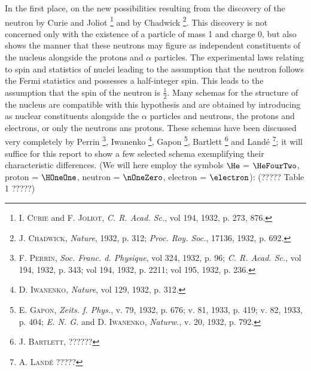 \documentclass{article}
\begin{document}
In the first place, on the new possibilities resulting from the discovery of the neutron by Curie and Joliot \footnote{\textsc{I. Curie} and \textsc{F. Joliot}, \textit{C. R. Acad. Sc.}, vol 194, 1932, p. 273, 876.} and by Chadwick \footnote{\textsc{J. Chadwick}, \textit{Nature}, 1932, p. 312; \textit{Proc. Roy. Soc.}, 17136, 1932, p. 692.}. This discovery is not concerned only with the existence of a particle of mass 1 and charge 0, but also shows the manner that these neutrons may figure as independent constituents of the nucleus alongside the protons and $\alpha$ particles. The experimental laws relating to spin and statistics of nuclei leading to the assumption that the neutron follows the Fermi statistics and possesses a half-integer spin. This leads to the assumption that the spin of the neutron is $\frac{1}{2}$.
Many schemas for the structure of the nucleus are compatible with this hypothesis and are obtained by introducing as nuclear constituents alongside the $\alpha$ particles and neutrons, the protons and electrons, or only the neutrons ans protons. These schemas have been discussed very completely by Perrin \footnote{\textsc{F. Perrin}, \textit{Soc. Franc. d. Physique}, vol 324, 1932, p. 96; \textit{C. R. Acad. Sc.}, vol 194, 1932, p. 343; vol 194, 1932, p. 2211; vol 195, 1932, p. 236.}, Iwanenko \footnote{\textsc{D. Iwanenko}, \textit{Nature}, vol 129, 1932, p. 312.}, Gapon \footnote{\textsc{E. Gapon}, \textit{Zeits. f. Phys.}, v. 79, 1932, p. 676; v. 81, 1933, p. 419; v. 82, 1933, p. 404; \textit{E. N. G.} and \textsc{D. Iwanenko}, \textit{Naturw.}, v. 20, 1932, p. 792.}, Bartlett \footnote{\textsc{J. Bartlett}, ??????} and Landé \footnote{\textsc{A. Landé} ?????}; it will suffice for this report to show a few selected schema exemplifying their characteristic differences. (We will here employ the symbols $\He$ = $\HeFourTwo$, proton = $\HOneOne$, neutron = $\nOneZero$, electron = $\electron$):
(????? Table 1 ?????)
\end{document}
